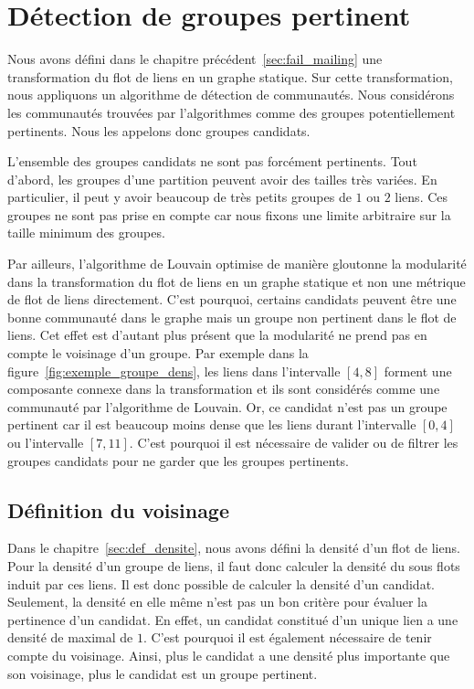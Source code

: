 \section{Détection de groupes pertinent}
\label{sec:groupe_dense_method}

Nous avons défini dans le chapitre précédent~\ref{sec:fail_mailing} une transformation du flot de liens en un graphe statique.
Sur cette transformation, nous appliquons un algorithme de détection de communautés.
Nous considérons les communautés trouvées par l'algorithmes comme des groupes potentiellement pertinents.
Nous les appelons donc groupes candidats.

L'ensemble des groupes candidats ne sont pas forcément pertinents.
Tout d'abord, les groupes d'une partition peuvent avoir des tailles très variées.
En particulier, il peut y avoir beaucoup de très petits groupes de $1$ ou $2$ liens.
Ces groupes ne sont pas prise en compte car nous fixons une limite arbitraire sur la taille minimum des groupes.

Par ailleurs, l'algorithme de Louvain optimise de manière gloutonne la modularité dans la transformation du flot de liens en un graphe statique et non une métrique de flot de liens directement.
C'est pourquoi, certains candidats peuvent être une bonne communauté dans le graphe mais un groupe non pertinent dans le flot de liens.
Cet effet est d'autant plus présent que la modularité ne prend pas en compte le voisinage d'un groupe.
Par exemple dans la figure~\ref{fig:exemple_groupe_dens}, les liens dans l'intervalle $[4,8]$ forment une composante connexe dans la transformation et ils sont considérés comme une communauté par l'algorithme de Louvain.
Or, ce candidat n'est pas un groupe pertinent car il est beaucoup moins dense que les liens durant l'intervalle $[0,4]$ ou l'intervalle $[7,11]$.
C'est pourquoi il est nécessaire de valider ou de filtrer les groupes candidats pour ne garder que les groupes pertinents.




\subsection{Définition du voisinage}
Dans le chapitre~\ref{sec:def_densite}, nous avons défini la densité d'un flot de liens.
Pour la densité d'un groupe de liens, il faut donc calculer la densité du sous flots induit par ces liens.
Il est donc possible de calculer la densité d'un candidat.
Seulement, la densité en elle même n'est pas un bon critère pour évaluer la pertinence d'un candidat.
En effet, un candidat constitué d'un unique lien a une densité de maximal de $1$.
C'est pourquoi il est également nécessaire de tenir compte du voisinage.
Ainsi, plus le candidat a une densité plus importante que son voisinage, plus le candidat est un groupe pertinent.

